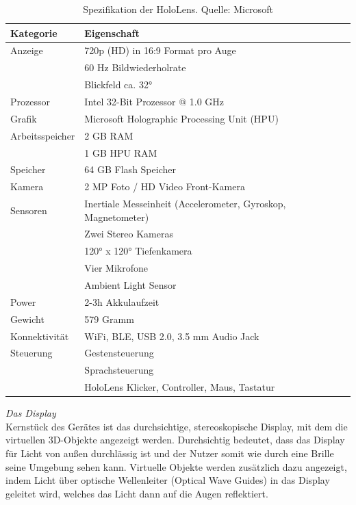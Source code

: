 \setlength\extrarowheight{2pt}
\begin{table}[htb]
	\centering
	\begin{tabular}{l|l}
		Kategorie & Eigenschaft\\
		\hline
		Anzeige & 720p (HD) in 16:9 Format pro Auge\\
		& 60 Hz Bildwiederholrate\\
		& Blickfeld ca. 32°\\
		Prozessor & Intel 32-Bit Prozessor @ 1.0 GHz\\
		Grafik & Microsoft Holographic Processing Unit (HPU)\\
		Arbeitsspeicher & 2 GB RAM\\
		& 1 GB HPU RAM\\
		Speicher & 64 GB Flash Speicher\\
		Kamera & 2 MP Foto / HD Video Front-Kamera\\
		Sensoren & Inertiale Messeinheit (Accelerometer, Gyroskop, Magnetometer) \\
		& Zwei Stereo Kameras\\
		& 120° x 120° Tiefenkamera\\
		& Vier Mikrofone\\
		& Ambient Light Sensor\\
		Power & 2-3h Akkulaufzeit \\
		Gewicht & 579 Gramm \\
		Konnektivität & WiFi, BLE, USB 2.0, 3.5 mm Audio Jack \\
		Steuerung & Gestensteuerung\\
		& Sprachsteuerung\\
		& HoloLens Klicker, Controller, Maus, Tastatur\\
	\end{tabular}\caption{\label{tab:hololens_tech_details} Spezifikation der HoloLens. Quelle: Microsoft}
\end{table}

\vspace{4px}
\textit{Das Display}\\
Kernstück des Gerätes ist das durchsichtige, stereoskopische Display, mit dem die virtuellen 3D-Objekte angezeigt werden. Durchsichtig bedeutet, dass das Display für Licht von außen durchlässig ist und der Nutzer somit wie durch eine Brille seine Umgebung sehen kann. Virtuelle Objekte werden zusätzlich dazu angezeigt, indem Licht über optische Wellenleiter (Optical Wave Guides) in das Display geleitet wird, welches das Licht dann auf die Augen reflektiert.\\

